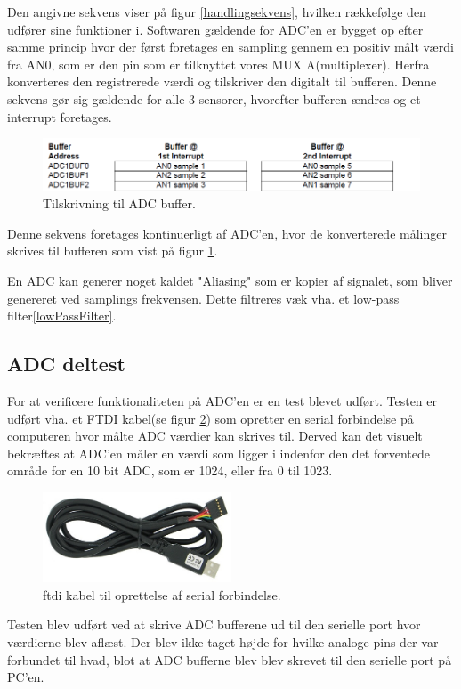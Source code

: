Den angivne sekvens viser på figur \ref{handlingsekvens}, hvilken rækkefølge den udfører sine funktioner i. Softwaren gældende for ADC'en er bygget op efter samme princip hvor der først foretages en sampling gennem en positiv målt værdi fra AN0, som er den pin som er tilknyttet vores MUX A(multiplexer). Herfra konverteres den registrerede værdi og tilskriver den digitalt til bufferen. Denne sekvens gør sig gældende for alle 3 sensorer, hvorefter bufferen ændres og et interrupt foretages. 

\begin{figure}[h!]
  \centering
  \includegraphics[width=1.1\textwidth]{figures/adcBuffer.png}
  \caption{Tilskrivning til ADC buffer.}
  \label{adcBuffer}
\end{figure}

Denne sekvens foretages kontinuerligt af ADC'en, hvor de konverterede målinger skrives til bufferen som vist på figur \ref{adcBuffer}. 

En ADC kan generer noget kaldet "Aliasing" som er kopier af signalet, som bliver genereret ved samplings frekvensen. Dette filtreres væk vha. et low-pass filter\ref{lowPassFilter}.
\newpage
\subsection{ADC deltest}
For at verificere funktionaliteten på ADC'en er en test blevet udført. Testen er udført vha. et FTDI kabel(se figur \ref{ftdi_cable}) som opretter en serial forbindelse på computeren hvor målte ADC værdier kan skrives til. Derved kan det visuelt bekræftes at ADC'en måler en værdi som ligger i indenfor den det forventede område for en 10 bit ADC, som er 1024, eller fra 0 til 1023.


\begin{figure}[h!]
  \centering
  \includegraphics[width=0.5\textwidth]{figures/ftdi_cable.png}
  \caption{ftdi kabel til oprettelse af serial forbindelse.}
  \label{ftdi_cable}
\end{figure} 
Testen blev udført ved at skrive ADC bufferene ud til den serielle port hvor værdierne blev aflæst. Der blev ikke taget højde for hvilke analoge pins der var forbundet til hvad, blot at ADC bufferne blev blev skrevet til den serielle port på PC'en.

